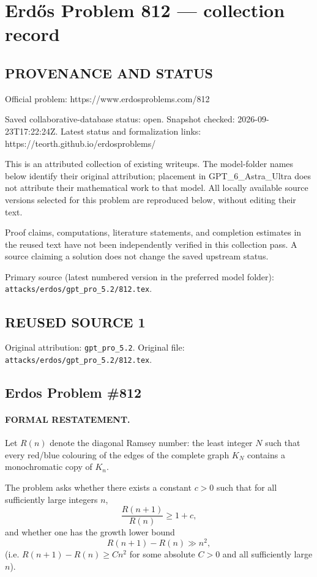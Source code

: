 \section*{Erd\H{o}s Problem 812 --- collection record}

\subsection*{PROVENANCE AND STATUS}
Official problem: https://www.erdosproblems.com/812

Saved collaborative-database status: open.
Snapshot checked: 2026-09-23T17:22:24Z.
Latest status and formalization links: https://teorth.github.io/erdosproblems/

This is an attributed collection of existing writeups. The model-folder names below identify their original attribution; placement in GPT\_6\_Astra\_Ultra does not attribute their mathematical work to that model. All locally available source versions selected for this problem are reproduced below, without editing their text.

Proof claims, computations, literature statements, and completion estimates in the reused text have not been independently verified in this collection pass. A source claiming a solution does not change the saved upstream status.

Primary source (latest numbered version in the preferred model folder): \texttt{attacks/erdos/gpt\_pro\_5.2/812.tex}.

\subsection*{REUSED SOURCE 1}
Original attribution: \texttt{gpt\_pro\_5.2}.
Original file: \texttt{attacks/erdos/gpt\_pro\_5.2/812.tex}.


\subsection*{Erdos Problem \#812}

\paragraph{FORMAL RESTATEMENT.}
Let $R(n)$ denote the diagonal Ramsey number: the least integer $N$ such that every red/blue colouring of the edges of the complete graph $K_N$ contains a monochromatic copy of $K_n$.

The problem asks whether there exists a constant $c>0$ such that for all sufficiently large integers $n$,
\[
\frac{R(n+1)}{R(n)} \ge 1+c,
\]
and whether one has the growth lower bound
\[
R(n+1)-R(n) \gg n^2,
\]
(i.e. $R(n+1)-R(n) \ge C n^2$ for some absolute $C>0$ and all sufficiently large $n$).

